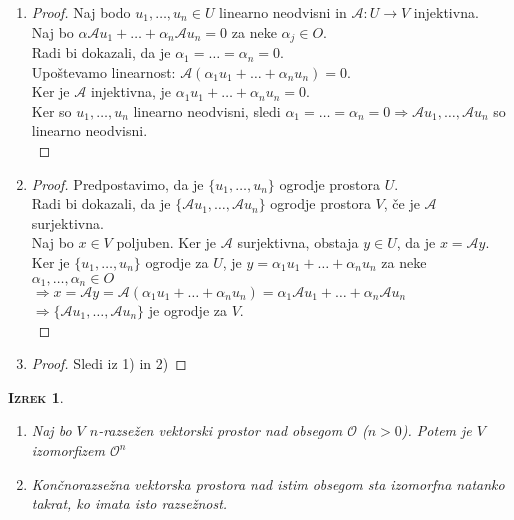 \documentclass[a4paper,12pt]{article}
\newcommand{\A}{\mathcal{A}}
\newtheorem*{izrek}{\textsc{Izrek}}
\begin{document}
\begin{enumerate}
\item[1)] \begin{proof}
Naj bodo $u_1,\ldots,u_n\in U$ linearno neodvisni in $\A:U\to V$ injektivna. \\

Naj bo $\alpha \A u_1+\ldots+\alpha_n \A u_n=0$ za neke $\alpha_j\in O$. \\

Radi bi dokazali, da je $\alpha_1=\ldots=\alpha_n=0$. \\

Upoštevamo linearnost: $\A (\alpha_1u_1+\ldots+\alpha_nu_n)=0$. \\

Ker je $\A$ injektivna, je $\alpha_1u_1+\ldots+\alpha_nu_n=0$. \\

Ker so $u_1,\ldots,u_n$ linearno neodvisni, sledi $\alpha_1=\ldots=\alpha_n=0\Rightarrow \A u_1,\ldots,\A u_n$ so linearno neodvisni.\\
\end{proof}

\item[2)] \begin{proof}
Predpostavimo, da je $\{u_1,\ldots,u_n\}$ ogrodje prostora $U$. \\

Radi bi dokazali, da je $\{\A u_1,\ldots,\A u_n\}$ ogrodje prostora $V$, če je $\A$ surjektivna. \\

Naj bo $x\in V$ poljuben. Ker je $\A$ surjektivna, obstaja $y\in U$, da je $x=\A y$. \\

Ker je $\{u_1,\ldots,u_n\}$ ogrodje za $U$, je $y=\alpha_1u_1+\ldots+\alpha_nu_n$ za neke $\alpha_1,\ldots,\alpha_n\in O$ \\

$\Rightarrow x=\A y=\A (\alpha_1u_1+\ldots+\alpha_nu_n)=\alpha_1 \A u_1+\ldots+\alpha_n \A u_n$ \\

$\Rightarrow \{\A u_1,\ldots,\A u_n\}$ je ogrodje za $V$.\\
\end{proof}


\item[3)] \begin{proof} Sledi iz 1) in 2) \end{proof}

\end{enumerate}
\newpage
\begin{izrek} ~

\begin{enumerate}
\item[(1)] Naj bo $V$ $n$-razsežen vektorski prostor nad obsegom $\mathcal{O}$ ($n>0$). Potem je $V$ izomorfizem $\mathcal{O} ^n$
\item[(2)] Končnorazsežna vektorska prostora nad istim obsegom sta izomorfna natanko takrat, ko imata isto razsežnost.\\
\end{enumerate}
\end{izrek}
\end{document}
